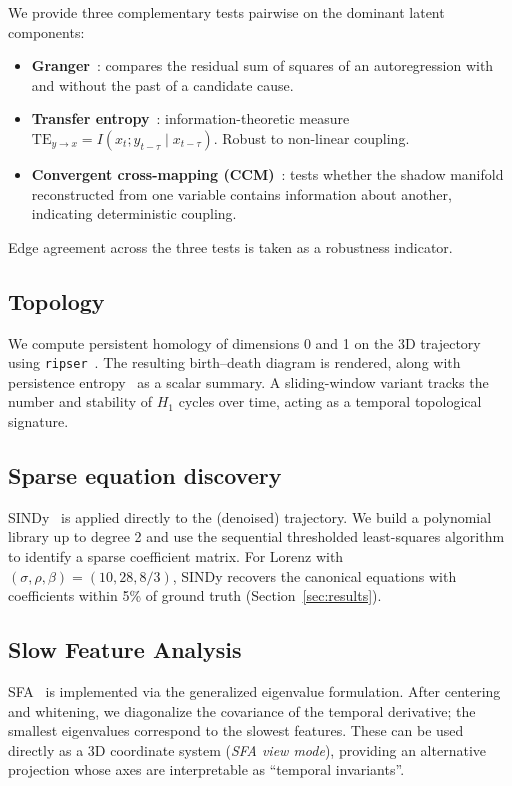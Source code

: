 \documentclass[11pt,a4paper]{article}
\begin{document}
We provide three complementary tests pairwise on the dominant
latent components:
\begin{itemize}[leftmargin=*]
    \item \textbf{Granger}~\cite{granger1969}: compares the residual
    sum of squares of an autoregression with and without the past of
    a candidate cause.
    \item \textbf{Transfer entropy}~\cite{schreiber2000te}:
    information-theoretic measure
    $\mathrm{TE}_{y\to x} = I(x_t; y_{t-\tau} \mid x_{t-\tau})$.
    Robust to non-linear coupling.
    \item \textbf{Convergent cross-mapping (CCM)}~\cite{sugihara2012ccm}:
    tests whether the shadow manifold reconstructed from one
    variable contains information about another, indicating
    deterministic coupling.
\end{itemize}
Edge agreement across the three tests is taken as a robustness
indicator.

\subsection{Topology}

We compute persistent homology of dimensions 0 and 1 on the 3D
trajectory using \texttt{ripser}~\cite{tralie2018ripser}. The
resulting birth--death diagram is rendered, along with persistence
entropy~\cite{rucco2017persistence} as a scalar summary. A sliding-window
variant tracks the number and stability of $H_1$ cycles over time,
acting as a temporal topological signature.

\subsection{Sparse equation discovery}

SINDy~\cite{brunton2016sindy} is applied directly to the (denoised)
trajectory. We build a polynomial library up to degree 2 and use the
sequential thresholded least-squares algorithm to identify a sparse
coefficient matrix. For Lorenz with $(\sigma, \rho, \beta) =
(10, 28, 8/3)$, SINDy recovers the canonical equations with
coefficients within 5\% of ground truth (Section~\ref{sec:results}).

\subsection{Slow Feature Analysis}

SFA~\cite{wiskott2002slow} is implemented via the generalized
eigenvalue formulation. After centering and whitening, we
diagonalize the covariance of the temporal derivative; the smallest
eigenvalues correspond to the slowest features. These can be used
directly as a 3D coordinate system (\emph{SFA view mode}), providing
an alternative projection whose axes are interpretable as
``temporal invariants''.
\end{document}
